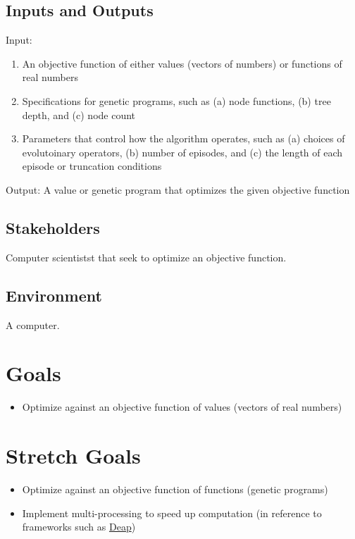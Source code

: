 \documentclass{article}
\begin{document}
\subsection{Inputs and Outputs}

Input: 
\begin{enumerate}
    \item An objective function of either values (vectors of numbers) or functions of real numbers
    \item Specifications for genetic programs, such as (a) node functions, (b) tree depth, and (c) node count
    \item Parameters that control how the algorithm operates, such as (a) choices of evolutoinary operators, (b) number of episodes, and (c) the length of each episode or truncation conditions
\end{enumerate}


Output: A value or genetic program that optimizes the given objective function


\subsection{Stakeholders}
Computer scientistst that seek to optimize an objective function.

\subsection{Environment}

A computer.

\section{Goals}

\begin{itemize}
    \item Optimize against an objective function of values (vectors of real numbers)
\end{itemize}

\section{Stretch Goals}

\begin{itemize}
    \item Optimize against an objective function of functions (genetic programs)
    \item Implement multi-processing to speed up computation (in reference to frameworks such as \href{https://deap.readthedocs.io/en/master/}{Deap})
\end{itemize}
\end{document}
